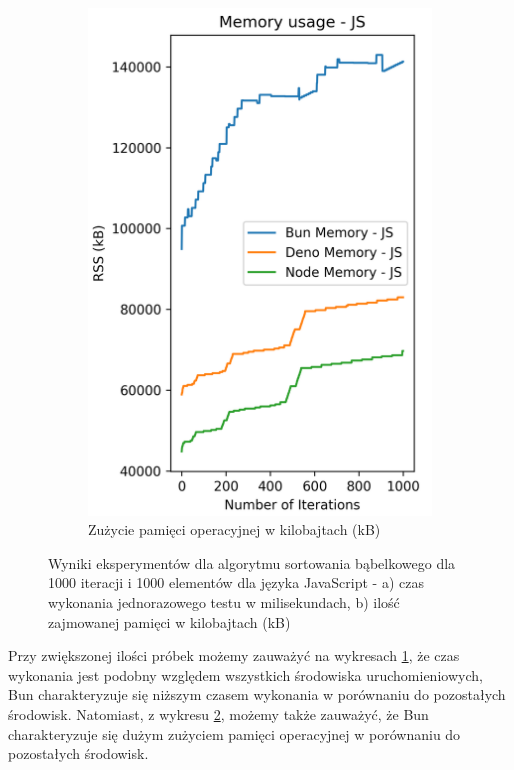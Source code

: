 \begin{figure}[H]
\begin{subfigure}[b]{0.42\textwidth}
    \label{fig:bubble_sorting_e2_time}
  \end{subfigure}
  \begin{subfigure}[b]{0.42\textwidth}
    \centering
    \includegraphics[width=\textwidth]{Figures/sorting/sorting_bubble_1000_1000_js_memory.png}
    \caption{Zużycie pamięci operacyjnej w kilobajtach (kB)}
    \label{fig:bubble_sorting_e2_memory}
  \end{subfigure}
  \caption{Wyniki eksperymentów dla algorytmu sortowania bąbelkowego dla 1000 iteracji i 1000 elementów dla języka JavaScript - a) czas wykonania jednorazowego testu w milisekundach, b) ilość zajmowanej pamięci w kilobajtach (kB)}
  \label{fig:bubble_sorting_e2}
\end{figure}

Przy zwiększonej ilości próbek możemy zauważyć na wykresach \ref{fig:bubble_sorting_e2_time}, że czas wykonania jest podobny względem wszystkich środowiska uruchomieniowych, Bun charakteryzuje się niższym czasem wykonania w porównaniu do pozostałych środowisk. Natomiast, z wykresu \ref{fig:bubble_sorting_e2_memory}, możemy także zauważyć, że Bun charakteryzuje się dużym zużyciem pamięci operacyjnej w porównaniu do pozostałych środowisk.

